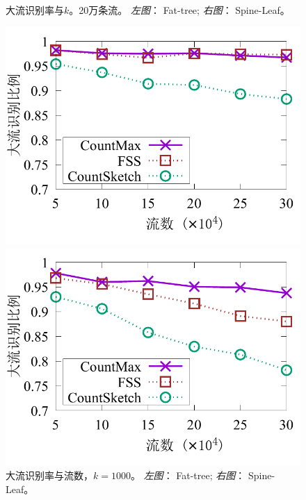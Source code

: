 \begin{figure}[ht]
\begin{minipage}[t]{0.49\linewidth}
	\end{minipage} \vspace{-0.6em}%
	\caption{\textnormal{大流识别率与$k$。20万条流。 \textit{左图}： Fat-tree; \textit{右图}： Spine-Leaf。}}
	\label{fig:hit,k,20}
\end{figure}

\begin{figure}[ht]
	\centering
	\begin{minipage}[t]{0.49\linewidth}
		\centering
		\includegraphics[width=\linewidth]{fig/ft_flow_hit_1000.pdf}
	\end{minipage}\vspace{-0.6em}%
	\begin{minipage}[t]{0.49\linewidth}
		\centering
		\includegraphics[width=\linewidth]{fig/hy_flow_hit_1000.pdf}
	\end{minipage} \vspace{-0.6em}%
	\caption{\textnormal{大流识别率与流数，$k=1000$。 \textit{左图}： Fat-tree; \textit{右图}： Spine-Leaf。}}
	\label{fig:hit,f,1000}
\end{figure}

